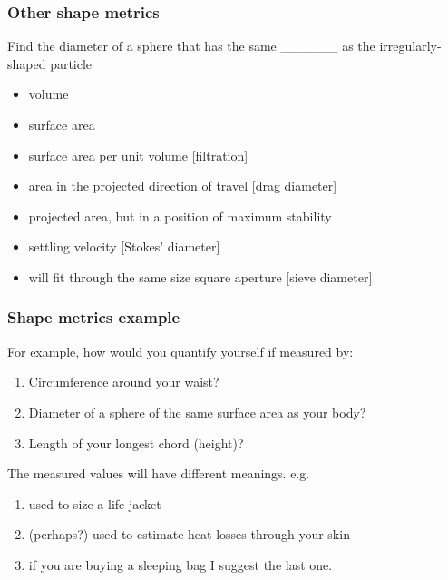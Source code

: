 \begin{frame}\frametitle{Other shape metrics}
	Find the diameter of a sphere that has the same \_\_\_\_\_\_ as the irregularly-shaped particle
	\begin{itemize}
		\item	volume
		\item	surface area
		\item	surface area per unit volume [filtration]
		\item	area in the projected direction of travel [drag diameter]
		\item	projected area, but in a position of maximum stability
		\item	settling velocity [Stokes' diameter]
		\item	will fit through the same size square aperture  [sieve diameter]
	\end{itemize}
\end{frame}

\begin{frame}\frametitle{Shape metrics example}
	
	For example, how would you quantify yourself if measured by:
	\begin{enumerate}
		\item	Circumference around your waist?
		\item	Diameter of a sphere of the same surface area as your body?
		\item	Length of your longest chord (height)?
		
	\end{enumerate}
	
	\vspace{12pt}
	The measured values will have different meanings. e.g.
	\begin{enumerate}
		\item	used to size a life jacket 
		\item	(perhaps?) used to estimate heat losses through your skin
		\item	if you are buying a sleeping bag I suggest the last one.
	\end{enumerate}
	
\end{frame}

